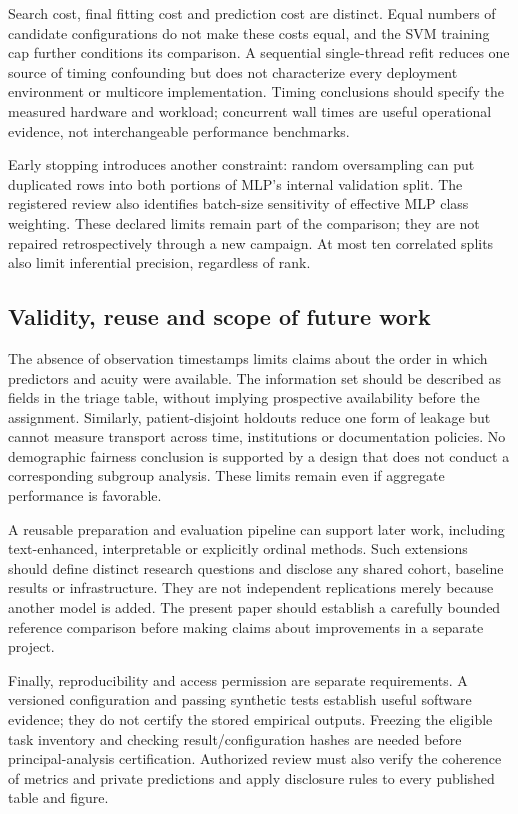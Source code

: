 Search cost, final fitting cost and prediction cost are distinct. Equal
numbers of candidate configurations do not make these costs equal, and
the SVM training cap further conditions its comparison. A sequential
single-thread refit reduces one source of timing confounding but does not
characterize every deployment environment or multicore implementation.
Timing conclusions should specify the measured hardware and workload;
concurrent wall times are useful operational evidence, not interchangeable
performance benchmarks.

Early stopping introduces another constraint: random oversampling can put
duplicated rows into both portions of MLP's internal validation split. The
registered review also identifies batch-size sensitivity of effective MLP
class weighting. These declared limits remain part of the comparison; they
are not repaired retrospectively through a new campaign. At most ten
correlated splits also limit inferential precision, regardless of rank.

\subsection{Validity, reuse and scope of future work}
The absence of observation timestamps limits claims about the order in
which predictors and acuity were available. The information set should be
described as fields in the triage table, without implying prospective
availability before the assignment. Similarly, patient-disjoint holdouts
reduce one form of leakage but cannot measure transport across time,
institutions or documentation policies. No demographic fairness conclusion
is supported by a design that does not conduct a corresponding subgroup
analysis. These limits remain even if aggregate performance is favorable.

A reusable preparation and evaluation pipeline can support later work,
including text-enhanced, interpretable or explicitly ordinal methods.
Such extensions should define distinct research questions and disclose
any shared cohort, baseline results or infrastructure. They are not
independent replications merely because another model is added. The
present paper should establish a carefully bounded reference comparison
before making claims about improvements in a separate project.

Finally, reproducibility and access permission are separate requirements.
A versioned configuration and passing synthetic tests establish useful
software evidence; they do not certify the stored empirical outputs.
Freezing the eligible task inventory and checking result/configuration
hashes are needed before principal-analysis certification. Authorized
review must also verify the coherence of metrics and private predictions
and apply disclosure rules to every published table and figure.

